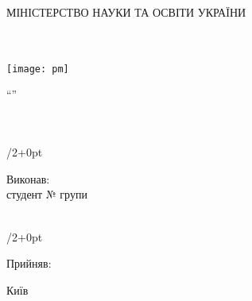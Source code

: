 
\newlength{\rightshift}
\setlength{\rightshift}{35pt}

\thispagestyle{empty}

{\sffamily
\begin{Center}
	{\LARGE{}МІНІСТЕРСТВО НАУКИ ТА ОСВІТИ УКРАЇНИ\\
	\university{}\\}
	{\Large\faculty{}\\\department{}}
\end{Center}

\vspace*{\fill}

\begin{Center}
	\texttt{[image: pm]}\\
\end{Center}

\vspace*{\fill}

\begin{Center}
	\Large
	\enquote{\subjectname{}}\\
	\prodname{} \prodnumber{}\\
	\proddate{}\\
\end{Center}

\vspace*{\fill}

\begin{adjustwidth}{\textwidth/2+\rightshift}{0pt}
	\begin{FlushLeft}
		\large
		Виконав:\\
		студент №\studentnumber{} групи \shortdepartment{} \groupnumber{} \shortuniversity{}\\
		\studentname{}\\
	\end{FlushLeft}
\end{adjustwidth}

\vspace{1cm}

\begin{adjustwidth}{\textwidth/2+\rightshift}{0pt}
	\begin{FlushLeft}
		\large
		Прийняв:\\
		\teacher{}
	\end{FlushLeft}
\end{adjustwidth}

\vspace*{\fill}

\begin{Center}
	Київ \the\year{}
\end{Center}
}

\pagebreak
\hypertarget{tocLink}{{\sffamily\tableofcontents}}
\pagebreak